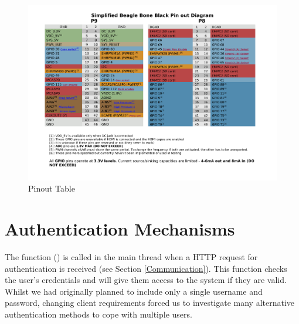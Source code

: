 \begin{figure}[H]
	\centering
	\includegraphics[angle=90,width=1.0\textwidth]{figures/pinout.pdf}
	\caption{Pinout Table} 
	\label{pinout.pdf}
\end{figure}


\section{Authentication Mechanisms}\label{Authentication Mechanisms}

The  function () is called in the main thread when a HTTP request for authentication is received (see Section \ref{Communication}). This function checks the user's credentials and will give them access to the system if they are valid. Whilst we had originally planned to include only a single username and password, changing client requirements forced us to investigate many alternative authentication methods to cope with multiple users.

